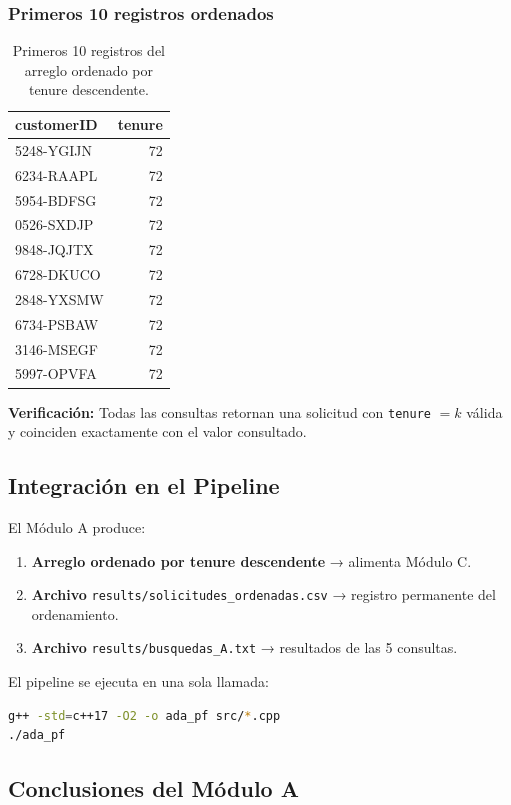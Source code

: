 \documentclass[12pt, a4paper]{article}
\begin{document}
\subsubsection*{Primeros 10 registros ordenados}

\begin{table}[h!]
\centering
\small
\begin{tabularx}{0.7\textwidth}{lr}
\toprule
\textbf{customerID} & \textbf{tenure} \\
\midrule
5248-YGIJN & 72 \\
6234-RAAPL & 72 \\
5954-BDFSG & 72 \\
0526-SXDJP & 72 \\
9848-JQJTX & 72 \\
6728-DKUCO & 72 \\
2848-YXSMW & 72 \\
6734-PSBAW & 72 \\
3146-MSEGF & 72 \\
5997-OPVFA & 72 \\
\bottomrule
\end{tabularx}
\caption{Primeros 10 registros del arreglo ordenado por tenure descendente.}
\end{table}

\textbf{Verificación:} Todas las consultas retornan una solicitud con \texttt{tenure} $= k$ válida y coinciden exactamente con el valor consultado.

\subsection{Integración en el Pipeline}

El Módulo A produce:
\begin{enumerate}
  \item \textbf{Arreglo ordenado por tenure descendente} → alimenta Módulo C.
  \item \textbf{Archivo} \texttt{results/solicitudes\_ordenadas.csv} → registro permanente del ordenamiento.
  \item \textbf{Archivo} \texttt{results/busquedas\_A.txt} → resultados de las 5 consultas.
\end{enumerate}

El pipeline se ejecuta en una sola llamada:
\begin{lstlisting}[language=bash]
g++ -std=c++17 -O2 -o ada_pf src/*.cpp
./ada_pf
\end{lstlisting}

\subsection{Conclusiones del Módulo A}
\end{document}
